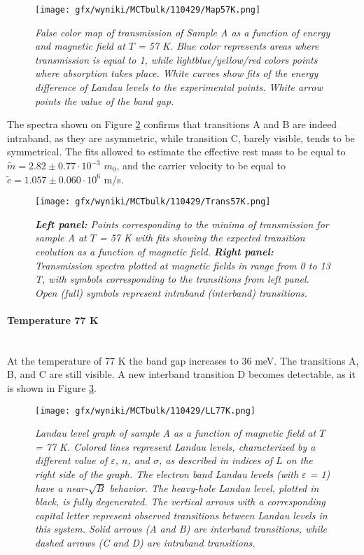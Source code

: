 \documentclass[titlepage,a4paper]{book}
\newcommand{\wciecie}{\quad\phantom{v}}
\newcommand{\myparagraph}[1]{\paragraph{#1}\mbox{}\\}
\begin{document}
\begin{figure}[ht]
	\centering
	\texttt{[image: gfx/wyniki/MCTbulk/110429/Map57K.png]}
	\vspace{-10pt}
	\caption{\textit{False color map of transmission of Sample A as a function of energy and magnetic field at $T$ = 57 K. Blue color represents areas where transmission is equal to 1, while lightblue/yellow/red colors points where absorption takes place. White curves show fits of the energy difference of Landau levels to the experimental points. White arrow points the value of the band gap.}}
	\label{fig:Map_110429_57K}
\end{figure} 

The spectra shown on Figure \ref{fig:Spectra_110429_57K} confirms that transitions A and B are indeed intraband, as they are asymmetric, while transition C, barely visible, tends to be symmetrical. The fits allowed to estimate the effective rest mass to be equal to $\tilde m = 2.82 \pm 0.77 \cdot 10^{-3}$ $m_0$, and the carrier velocity to be equal to $\tilde{c} = 1.057 \pm 0.060 \cdot 10^6$ m/s. 

\begin{figure}[ht]
	\centering
	\texttt{[image: gfx/wyniki/MCTbulk/110429/Trans57K.png]}
	\vspace{-10pt}
	\caption{\textit{\textbf{Left panel:} Points corresponding to the minima of transmission for sample A at $T$ = 57 K with fits showing the expected transition evolution as a function of magnetic field. \textbf{Right panel:} Transmission spectra plotted at magnetic fields in range from 0 to 13 T, with symbols corresponding to the transitions from left panel. Open (full) symbols represent intraband (interband) transitions.}}
	\label{fig:Spectra_110429_57K}
\end{figure}  

\clearpage
\myparagraph{Temperature 77 K}
\wciecie
At the temperature of 77 K the band gap increases to 36 meV. The transitions A, B, and C are still visible. A new interband transition D becomes detectable, as it is shown in Figure \ref{fig:LL_110429_77K}.
\begin{figure}[ht]
	\centering
	\texttt{[image: gfx/wyniki/MCTbulk/110429/LL77K.png]}
	\vspace{-10pt}
	\caption{\textit{Landau level graph of sample A as a function of magnetic field at $T$ = 77 K. Colored lines represent Landau levels, characterized by a different value of $\varepsilon$, $n$, and $\sigma$, as described in indices of $L$ on the right side of the graph. The electron band Landau levels (with $\varepsilon$ = 1) have a near-$\sqrt{B}$ behavior. The heavy-hole Landau level, plotted in black, is fully degenerated. The vertical arrows with a corresponding capital letter represent observed transitions between Landau levels in this system. Solid arrows (A and B) are interband transitions, while dashed arrows (C and D) are intraband transitions.}}
	\label{fig:LL_110429_77K}
\end{figure}
\end{document}
